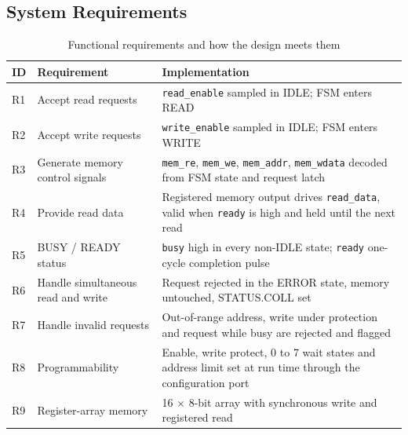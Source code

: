 \documentclass[11pt,a4paper]{article}
\newcommand{\sig}[1]{\texttt{#1}}
\begin{document}
\subsection{System Requirements}
\begin{table}[H]
\centering
\caption{Functional requirements and how the design meets them}
\label{tab:req}
\small
\begin{tabularx}{\textwidth}{@{}l X X@{}}
\toprule
\textbf{ID} & \textbf{Requirement} & \textbf{Implementation} \\
\midrule
R1 & Accept read requests & \sig{read\_enable} sampled in IDLE; FSM enters READ \\
R2 & Accept write requests & \sig{write\_enable} sampled in IDLE; FSM enters WRITE \\
R3 & Generate memory control signals & \sig{mem\_re}, \sig{mem\_we}, \sig{mem\_addr}, \sig{mem\_wdata} decoded from FSM state and request latch \\
R4 & Provide read data & Registered memory output drives \sig{read\_data}, valid when \sig{ready} is high and held until the next read \\
R5 & BUSY / READY status & \sig{busy} high in every non-IDLE state; \sig{ready} one-cycle completion pulse \\
R6 & Handle simultaneous read and write & Request rejected in the ERROR state, memory untouched, STATUS.COLL set \\
R7 & Handle invalid requests & Out-of-range address, write under protection and request while busy are rejected and flagged \\
R8 & Programmability & Enable, write protect, 0 to 7 wait states and address limit set at run time through the configuration port \\
R9 & Register-array memory & 16 $\times$ 8-bit array with synchronous write and registered read \\
\bottomrule
\end{tabularx}
\end{table}
\end{document}
